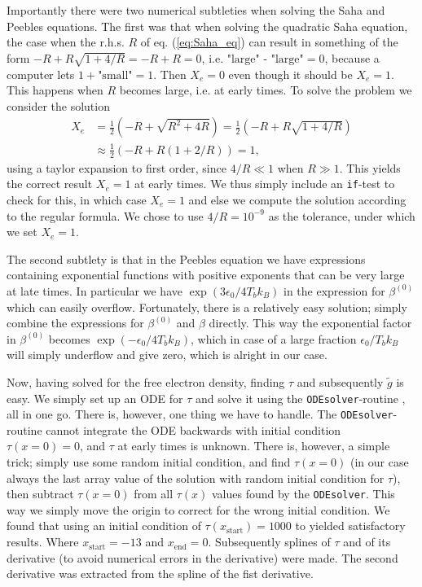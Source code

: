 \documentclass[twocolumn]{aastex62}
\begin{document}
Importantly there were two numerical subtleties when solving the Saha and Peebles equations. The first was that when solving the quadratic Saha equation, the case when the r.h.s. $R$ of eq. (\ref{eq:Saha_eq}) can result in something of the form $-R + R\sqrt{1 + 4/R} = -R + R = 0$, i.e. $\text{"large" - "large"} = 0$, because a computer lets $1 + \text{"small"} = 1$. Then $X_e = 0$ even though it should be $X_e = 1$. This happens when $R$ becomes large, i.e. at early times. To solve the problem we consider the solution 
\begin{align}
    X_e &= \frac{1}{2} (-R + \sqrt{R^2 + 4R}) = \frac{1}{2} (-R + R\sqrt{1 + 4/R})\\
        &\approx \frac{1}{2} (-R + R(1 + 2/R)) = 1,
\end{align}
using a taylor expansion to first order, since $4/R \ll 1$ when $R\gg 1$. This yields the correct result $X_e = 1$ at early times. We thus simply include an \texttt{if}-test to check for this, in which case $X_e = 1$ and else we compute the solution according to the regular formula. We chose to use $4/R = 10^{-9}$ as the tolerance, under which we set $X_e = 1$. 

The second subtlety is that in the Peebles equation we have expressions containing exponential functions with positive exponents that can be very large at late times. In particular we have $\exp\left(3\epsilon_0 / 4T_b k_B\right)$ in the expression for $\beta^{(0)}$ which can easily overflow. Fortunately, there is a relatively easy solution; simply combine the expressions for $\beta^{(0)}$ and $\beta$ directly. This way the exponential factor in $\beta^{(0)}$ becomes $\exp\left(-\epsilon_0 / 4T_b k_B\right)$, which in case of a large fraction $\epsilon_0 / T_b k_B$ will simply underflow and give zero, which is alright in our case.

Now, having solved for the free electron density, finding $\tau$ and subsequently $\tilde{g}$ is easy. We simply set up an ODE for $\tau$ and solve it using the \texttt{ODEsolver}-routine \citep[]{winther:2020}, all in one go. There is, however, one thing we have to handle. The \texttt{ODEsolver}-routine cannot integrate the ODE backwards with initial condition $\tau(x = 0) = 0$, and $\tau$ at early times is unknown. There is, however, a simple trick; simply use some random initial condition, and find $\tau(x=0)$ (in our case always the last array value of the solution with random initial condition for $\tau$), then subtract $\tau(x = 0)$ from all $\tau(x)$ values found by the \texttt{ODEsolver}. This way we simply move the origin to correct for the wrong initial condition. We found that using an initial condition of $\tau(x_\text{start}) = 1000$ to yielded satisfactory results. Where $x_\text{start} = -13$ and $x_\text{end} = 0$. Subsequently splines of $\tau$ and of its derivative (to avoid numerical errors in the derivative) were made. The second derivative was extracted from the spline of the fist derivative.
\end{document}
